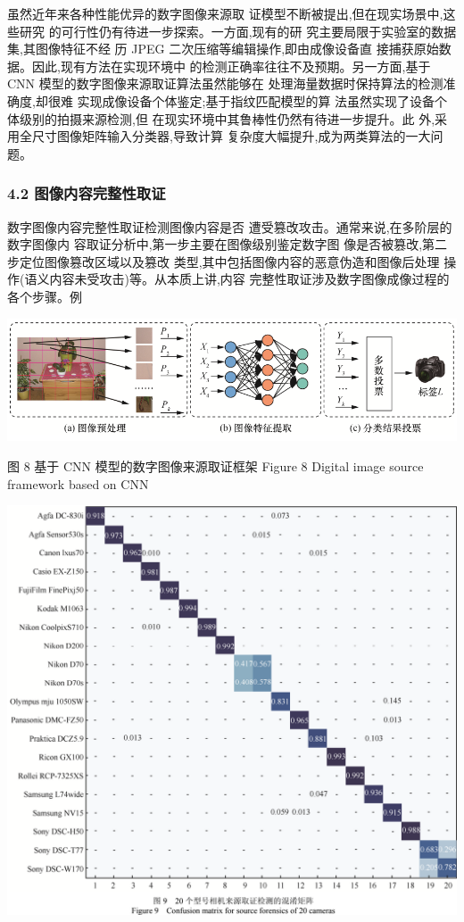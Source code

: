 \documentclass{article}
\begin{document}
虽然近年来各种性能优异的数字图像来源取 证模型不断被提出,但在现实场景中,这些研究 的可行性仍有待进一步探索。一方面,现有的研 究主要局限于实验室的数据集,其图像特征不经 历 JPEG 二次压缩等编辑操作,即由成像设备直 接捕获原始数据。因此,现有方法在实现环境中 的检测正确率往往不及预期。另一方面,基于 CNN 模型的数字图像来源取证算法虽然能够在 处理海量数据时保持算法的检测准确度,却很难 实现成像设备个体鉴定;基于指纹匹配模型的算 法虽然实现了设备个体级别的拍摄来源检测,但 在现实环境中其鲁棒性仍然有待进一步提升。此 外,采用全尺寸图像矩阵输入分类器,导致计算 复杂度大幅提升,成为两类算法的一大问题。

\subsubsection{\textbf{4.2} 图像内容完整性取证}

数字图像内容完整性取证检测图像内容是否 遭受篡改攻击。通常来说,在多阶层的数字图像内 容取证分析中,第一步主要在图像级别鉴定数字图 像是否被篡改,第二步定位图像篡改区域以及篡改 类型,其中包括图像内容的恶意伪造和图像后处理 操作(语义内容未受攻击)等。从本质上讲,内容 完整性取证涉及数字图像成像过程的各个步骤。例


\includegraphics{_page_9_Figure_11.png}


图 8 基于 CNN 模型的数字图像来源取证框架 Figure 8 Digital image source framework based on CNN


\includegraphics{_page_10_Figure_2.png}
\end{document}

